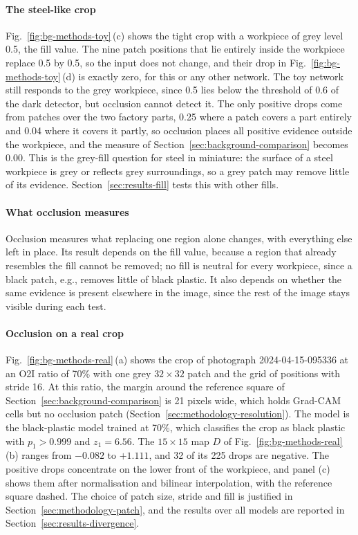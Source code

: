 \paragraph{The steel-like crop}
Fig.~\ref{fig:bg-methods-toy}\,(c) shows the tight crop with a workpiece of grey level
0.5, the fill value. The nine patch positions that lie entirely inside the workpiece
replace 0.5 by 0.5, so the input does not change, and their drop in
Fig.~\ref{fig:bg-methods-toy}\,(d) is exactly zero, for this or any other network. The
toy network still responds to the grey workpiece, since 0.5 lies below the threshold of
0.6 of the dark detector, but occlusion cannot detect it. The only positive drops come from
patches over the two factory parts, 0.25 where a patch covers a part entirely and 0.04
where it covers it partly, so occlusion places all positive evidence outside the
workpiece, and the measure of Section~\ref{sec:background-comparison} becomes 0.00. This
is the grey-fill question for steel in miniature: the surface of a steel workpiece is
grey or reflects grey surroundings, so a grey patch may remove little of its evidence.
Section~\ref{sec:results-fill} tests this with other fills.

\paragraph{What occlusion measures}
Occlusion measures what replacing one region alone changes, with everything else left in
place. Its result depends on the fill value, because a region that already resembles
the fill cannot be removed; no fill is neutral for every workpiece, since a black patch,
e.g., removes little of black plastic. It also depends on whether the same evidence is present
elsewhere in the image, since the rest of the image stays visible during each test.

\paragraph{Occlusion on a real crop}
Fig.~\ref{fig:bg-methods-real}\,(a) shows the crop of photograph 2024-04-15-095336 at an
O2I ratio of 70\% with one grey $32 \times 32$ patch and the grid of positions with
stride 16. At this ratio, the margin around the reference square of
Section~\ref{sec:background-comparison} is 21 pixels wide, which holds Grad-CAM cells but
no occlusion patch (Section~\ref{sec:methodology-resolution}). The model is the
black-plastic model trained at 70\%, which classifies the crop as black plastic with
$p_1 > 0.999$ and $z_1 = 6.56$. The $15 \times 15$ map $D$ of
Fig.~\ref{fig:bg-methods-real}\,(b) ranges from $-0.082$ to $+1.111$, and 32 of its 225
drops are negative. The positive drops concentrate on the lower front of the workpiece,
and panel (c) shows them after normalisation and bilinear interpolation, with the reference square dashed. The choice of patch
size, stride and fill is justified in Section~\ref{sec:methodology-patch}, and the
results over all models are reported in Section~\ref{sec:results-divergence}.

